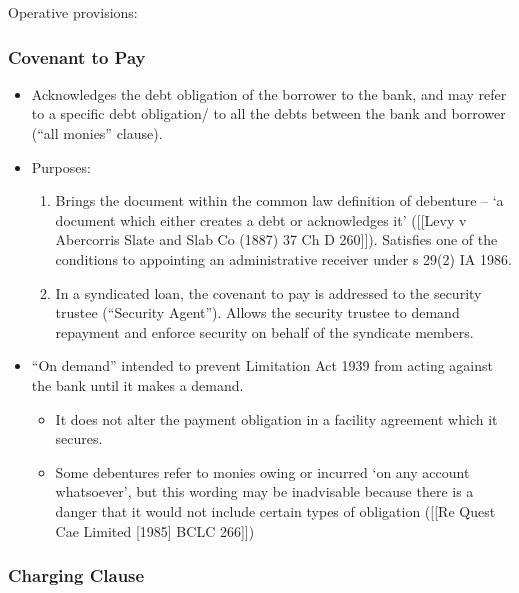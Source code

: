 \documentclass[
]{article}
\providecommand{\tightlist}{%
  \setlength{\itemsep}{0pt}\setlength{\parskip}{0pt}}
\begin{document}
Operative provisions:

\hypertarget{covenant-to-pay}{%
\subsubsection{Covenant to Pay}\label{covenant-to-pay}}

\begin{itemize}
\tightlist
\item
  Acknowledges the debt obligation of the borrower to the bank, and may
  refer to a specific debt obligation/ to all the debts between the bank
  and borrower (``all monies'' clause).
\item
  Purposes:

  \begin{enumerate}
  \def\labelenumi{\arabic{enumi}.}
  \tightlist
  \item
    Brings the document within the common law definition of debenture --
    `a document which either creates a debt or acknowledges it'
    ({[}{[}Levy v Abercorris Slate and Slab Co (1887) 37 Ch D
    260{]}{]}). Satisfies one of the conditions to appointing an
    administrative receiver under s 29(2) IA 1986.
  \item
    In a syndicated loan, the covenant to pay is addressed to the
    security trustee (``Security Agent''). Allows the security trustee
    to demand repayment and enforce security on behalf of the syndicate
    members.
  \end{enumerate}
\item
  ``On demand'' intended to prevent Limitation Act 1939 from acting
  against the bank until it makes a demand.

  \begin{itemize}
  \tightlist
  \item
    It does not alter the payment obligation in a facility agreement
    which it secures.
  \item
    Some debentures refer to monies owing or incurred `on any account
    whatsoever', but this wording may be inadvisable because there is a
    danger that it would not include certain types of obligation
    ({[}{[}Re Quest Cae Limited {[}1985{]} BCLC 266{]}{]})
  \end{itemize}
\end{itemize}

\hypertarget{charging-clause}{%
\subsubsection{Charging Clause}\label{charging-clause}}
\end{document}
